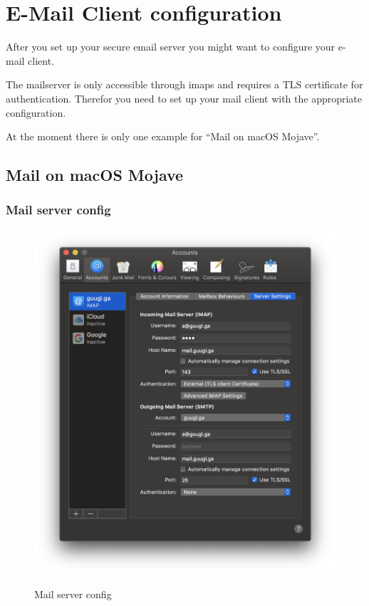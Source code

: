 \chapter{E-Mail Client configuration}
After you set up your secure email server you might want to configure your e-mail client.

The mailserver is only accessible through imaps and requires a TLS certificate for authentication.
Therefor you need to set up your mail client with the appropriate configuration.

At the moment there is only one example for \enquote{Mail on macOS Mojave}.

\section{Mail on macOS Mojave}
\subsection{Mail server config}
\begin{figure}[H]
        \centering
        \includegraphics[width=0.8\linewidth]{pics/email_client_config_servers}
        \label{fig:mailserversetting}
                \caption{Mail server config}
\end{figure}

